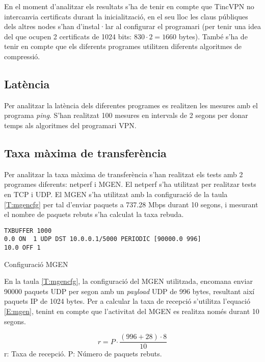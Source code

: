 En el moment d'analitzar els resultats s'ha de tenir en compte que TincVPN no intercanvia certificats durant la inicialització, en el seu lloc les claus públiques dels altres nodes s'han d'instal·lar al configurar el programari (per tenir una idea del que ocupen 2 certificats de 1024 bits: $830\cdot2=1660$ bytes).
També s'ha de tenir en compte que els diferents programes utilitzen diferents algoritmes de compressió. 

\subsection{Latència}
Per analitzar la latència dels diferentes programes es realitzen les mesures amb el programa \emph{ping}. S'han realitzat 100 mesures en intervals de 2 segons per donar temps als algoritmes del programari VPN.

\subsection{Taxa màxima de transferència}
Per analitzar la taxa màxima de transferència s'han realitzat els tests amb 2 programes diferents: netperf i MGEN.
El netperf s'ha utilitzat per realitzar tests en TCP i UDP.
El MGEN s'ha utilitzat amb la configuració de la taula \ref{T:mgencfg} per tal d'enviar paquets a 737.28 Mbps durant 10 segons, i mesurant el nombre de paquets rebuts s'ha calculat la taxa rebuda.
\begin{table}[htb]
\begin{center}
\begin{minipage}[htb]{0.6\linewidth}
\footnotesize
\begin{verbatim}
TXBUFFER 1000
0.0 ON  1 UDP DST 10.0.0.1/5000 PERIODIC [90000.0 996]
10.0 OFF 1
\end{verbatim}
\end{minipage}
\caption{Configuració MGEN}
\label{T:mgencfg}
\end{center}
\end{table}

En la taula \ref{T:mgencfg}, la configuració del MGEN utilitzada, encomana enviar 90000 paquets UDP per segon amb un \emph{payload} UDP de 996 bytes, resultant així paquets IP de 1024 bytes. Per a calcular la taxa de recepció s'utilitza l'equació \ref{E:mgen}, tenint en compte que l'activitat del MGEN es realitza només durant 10 segons.

\begin{minipage}[htb]{\linewidth}
\begin{equation}\label{E:mgen}
r=P\cdot\frac{(996+28)\cdot8}{10}
\end{equation}
\centering
{\scriptsize
r: Taxa de recepció. 
P: Número de paquets rebuts. 
}\\
\vspace{1em}
\end{minipage}

